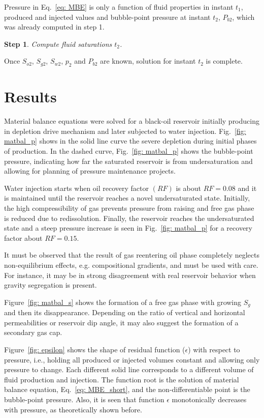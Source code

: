 \documentclass[authoryear,preprint,review,12pt]{elsarticle}
\newtheorem{step}{Step}
\begin{document}
Pressure in Eq.~\eqref{eq: MBE} is only a function of fluid properties in instant $t_1$, produced and injected values and bubble-point pressure at instant $t_2$, $P_{b2}$, which was already computed in step 1.

\begin{step}
Compute fluid saturations $t_2$.
\end{step}

Once $S_{o2}$, $S_{g2}$, $S_{w2}$, $p_2$ and $P_{b2}$ are known, solution for instant $t_2$ is complete.

\section{Results}
Material balance equations were solved for a black-oil reservoir initially producing in depletion drive mechanism and later subjected to water injection. Fig.~\ref{fig: matbal_p} shows in the solid line curve the severe depletion during initial phases of production. In the dashed curve, Fig.~\ref{fig: matbal_p} shows the bubble-point pressure, indicating how far the saturated reservoir is from undersaturation and allowing for planning of pressure maintenance projects.


Water injection starts when oil recovery factor $(RF)$ is about $RF=0.08$ and it is maintained until the reservoir reaches a novel undersaturated state. Initially, the high compressibility of gas prevents pressure from raising and free gas phase is reduced due to redissolution. Finally, the reservoir reaches the undersaturated state and a steep pressure increase is seen in Fig.~\ref{fig: matbal_p} for a recovery factor about $RF=0.15$.

It must be observed that the result of gas reentering oil phase completely neglects non-equilibrium effects, e.g. compositional gradients, and must be used with care. For instance, it may be in strong disagreement with real reservoir behavior when gravity segregation is present.

Figure~\ref{fig: matbal_s} shows the formation of a free gas phase with growing $S_g$ and then its disappearance. Depending on the ratio of vertical and horizontal permeabilities or reservoir dip angle, it may also suggest the formation of a secondary gas cap.

Figure~\ref{fig: epsilon} shows the shape of residual function ($\epsilon$) with respect to pressure, i.e., holding all produced or injected volumes constant and allowing only pressure to change. Each different solid line corresponds to a different volume of fluid production and injection. The function root is the solution of material balance equation, Eq.~\eqref{eq: MBE_short}, and the non-differentiable point is the bubble-point pressure. Also, it is seen that function $\epsilon$ monotonically decreases with pressure, as theoretically shown before.
\end{document}
